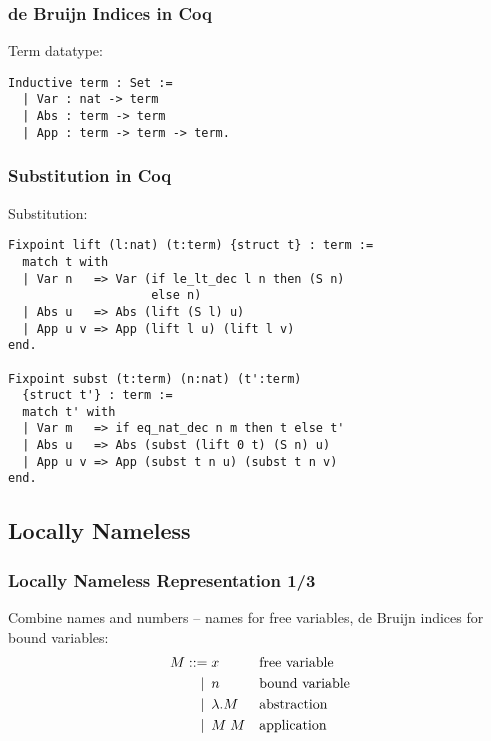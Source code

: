 \documentclass[notheorems]{beamer}
\begin{document}
\begin{frame}[fragile]

  \frametitle{de Bruijn Indices in Coq}

  Term datatype:
  \begin{lstlisting}
Inductive term : Set :=
  | Var : nat -> term
  | Abs : term -> term
  | App : term -> term -> term.
  \end{lstlisting}

\end{frame}


\begin{frame}[fragile]

  \frametitle{Substitution in Coq}

  Substitution:
  \begin{lstlisting}
Fixpoint lift (l:nat) (t:term) {struct t} : term :=
  match t with
  | Var n   => Var (if le_lt_dec l n then (S n)
                    else n)
  | Abs u   => Abs (lift (S l) u)
  | App u v => App (lift l u) (lift l v)
end.

Fixpoint subst (t:term) (n:nat) (t':term)
  {struct t'} : term :=
  match t' with
  | Var m   => if eq_nat_dec n m then t else t'
  | Abs u   => Abs (subst (lift 0 t) (S n) u)
  | App u v => App (subst t n u) (subst t n v)
end.
  \end{lstlisting}

\end{frame}


\subsection{Locally Nameless}




\begin{frame}

  \frametitle{Locally Nameless Representation 1/3}

  Combine names and numbers -- names for free variables, de Bruijn indices for bound variables:
  \begin{align*}
    M ::=             &\; x
    && \text{free variable} \\
    \llap{\textbar\:} &\; n
    && \text{bound variable} \\
    \llap{\textbar\:} &\; \lambda .M
    && \text{abstraction} \\
    \llap{\textbar\:} &\; M \; M
    && \text{application} \\
  \end{align*}


\end{frame}
\end{document}
